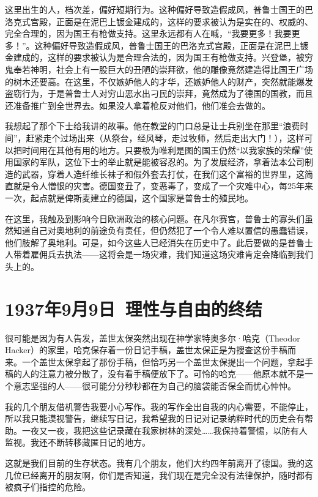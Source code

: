 \documentclass[UTF8]{ctexart}
\begin{document}
这里出生的人，档次差，偏好短期行为。这种偏好导致造假成风，普鲁士国王的巴洛克式宫殿，正面是在泥巴上镀金建成的，这样的要求被认为是实在的、权威的、完全合理的，因为国王有枪做支持。这里永远都有人在喊，“我要更多！我要更多！”。这种偏好导致造假成风，普鲁士国王的巴洛克式宫殿，正面是在泥巴上镀金建成的，这样的要求被认为是合理合法的，因为国王有枪做支持。兴登堡，被穷鬼奉若神明，社会上有一股巨大的丑陋的崇拜欲，他的雕像竟然建造得比国王广场的树木还要高。在这里，不仅嫉妒他人的才华，还嫉妒他人的财产，突然就能爆发盗窃行为，于是普鲁士人对穷山恶水出刁民的崇拜，竟然成为了德国的国教，而且还准备推广到全世界去。如果没人拿着枪反对他们，他们准会去做的。

我想起了那个下士给我讲的故事。他在教堂的门口总是让士兵别坐在那里“浪费时间”，赶紧走个过场出来（从祭台，经风琴，走过牧师，然后走出大门！），这样可以把时间用在其他有用的地方。只要极为唯利是图的国王仍然“以我家族的荣耀”使用国家的军队，这位下士的举止就是能被容忍的。为了发展经济，拿着法本公司制造的武器，穿着人造纤维长袜子和假外套去打仗，在我们这个富裕的世界里，这简直就是令人憎恨的灾害。德国变丑了，变恶毒了，变成了一个灾难中心，每25年来一次，起点就是俾斯麦建立的德国，这个国家是普鲁士的殖民地。

在这里，我触及到影响今日欧洲政治的核心问题。在凡尔赛宫，普鲁士的寡头们虽然知道自己对奥地利的前途负有责任，但仍然犯了一个令人难以置信的愚蠢错误，他们肢解了奥地利。可是，如今这些人已经消失在历史中了。此后要做的是普鲁士人带着雇佣兵去执法——这将会是一场灾难，我们知道这场灾难肯定会降临到我们头上的。

\section{1937年9月9日\ 理性与自由的终结}

很可能是因为有人告发，盖世太保突然出现在神学家特奥多尔·哈克（Theodor Hacker）的家里，哈克保存着一份日记手稿，盖世太保正是为搜查这份手稿而来。一个盖世太保拿起了那份手稿，但恰巧另一个盖世太保提出一个问题，拿起手稿的人的注意力被分散了，没有看手稿便放下了。可怜的哈克——他原本就不是一个意志坚强的人——很可能分分秒秒都在为自己的脑袋能否保全而忧心忡忡。

我的几个朋友借机警告我要小心写作。我的写作全出自我的内心需要，不能停止，所以我只能漠视警告，继续写日记，我希望我的日记对记录纳粹时代的历史会有帮助。一夜又一夜，我把这些记录藏在我家树林的深处……我保持着警惕，以防有人监视。我还不断转移藏匿日记的地方。

这就是我们目前的生存状态。我有几个朋友，他们大约四年前离开了德国。我的这几位已经离开的朋友啊，你们是否知道，我们现在是完全没有法律保护，随时都有被疯子们指控的危险。
\end{document}
